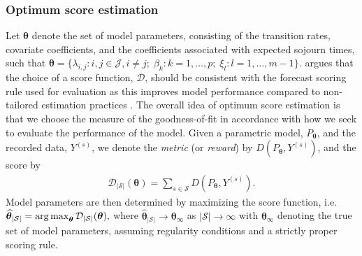 \subsubsection{Optimum score estimation}\label{sec:optimum_score_estimation}

Let $\bm{\theta}$ denote the set of model parameters, consisting of the transition rates, covariate coefficients, and the coefficients associated with expected sojourn times, such that $\bm{\theta} = \{ \lambda_{i,j} : i,j \in \mathcal{J}, i \neq j ; \; \beta_k : k = 1,\dots, p ; \; \xi_l : l = 1, \dots, m-1\} $. 
\citet{Gneiting2007} argues that the choice of a score function, $\mathcal{D}$, should be consistent with the forecast scoring rule used for evaluation as this improves model performance compared to non-tailored estimation practices \citep{friedman1983a,Copas1983}. 
The overall idea of optimum score estimation is that we choose the measure of the goodness-of-fit in accordance with how we seek to evaluate the performance of the model. 
Given a parametric model, $P_{\bm{\theta}}$, and the recorded data, $Y^{(s)}$, we denote the \textit{metric} (or \textit{reward}) by $D(P_{\bm{\theta}}, Y^{(s)})$, and the score by
\begin{align}
    \mathcal{D}_{|\mathcal{S}|}(\bm{\theta}) = \sum_{s \in \mathcal{S}} D\left(P_{\bm{\theta}}, Y^{(s)}\right). %
    \label{eq:mean_score}
\end{align}
Model parameters are then determined by maximizing the score function, i.e.
$\widehat{\bm{\theta}}_{|\mathcal{S}|} = \operatorname*{arg\,max}_{\bm{\theta}}\mathcal{D}_{|\mathcal{S}|}(\bm{\theta}), $
where $\widehat{\bm{\theta}}_{|\mathcal{S}|}  \rightarrow \bm{\theta}_{\infty}$ as $|\mathcal{S}| \rightarrow \infty$ with $\bm{\theta}_{\infty}$ denoting the true set of model parameters, assuming regularity conditions and a strictly proper scoring rule.

